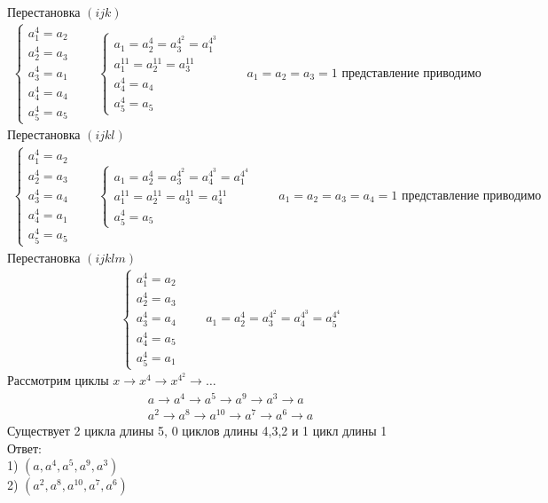 	Перестановка $(ijk)$
	\begin{gather*}
		\begin{cases}
			a_1^4 = a_2\\
			a_2^4 = a_3\\
			a_3^4 = a_1\\
			a_4^4 = a_4\\
			a_5^4 = a_5
		\end{cases}\qquad
		\begin{cases}
			a_1 = a_2^4 = a_3^{4^2} = a_1^{4^3}\\
			a_1^{11} = a_2^{11} = a_3^{11}\\
			a_4^4 = a_4\\
			a_5^4 = a_5
		\end{cases}\qquad
		a_1 = a_2 = a_3 = 1
		\text{ представление приводимо}
	\end{gather*}
	Перестановка $(ijkl)$
	\begin{gather*}
		\begin{cases}
			a_1^4 = a_2\\
			a_2^4 = a_3\\
			a_3^4 = a_4\\
			a_4^4 = a_1\\
			a_5^4 = a_5
		\end{cases}\qquad
		\begin{cases}
			a_1 = a_2^4 = a_3^{4^2} = a_4^{4^3} = a_1^{4^4}\\
			a_1^{11} = a_2^{11} = a_3^{11} = a_4^{11}\\
			a_5^4 = a_5
		\end{cases}\qquad
		a_1 = a_2 = a_3 = a_4 = 1
		\text{ представление приводимо}
	\end{gather*}	
	Перестановка $(ijklm)$
	\begin{gather*}
		\begin{cases}
			a_1^4 = a_2\\
			a_2^4 = a_3\\
			a_3^4 = a_4\\
			a_4^4 = a_5\\
			a_5^4 = a_1
		\end{cases}\qquad
			a_1 = a_2^4 = a_3^{4^2} = a_4^{4^3} = a_5^{4^4}
	\end{gather*}
	Рассмотрим циклы $x \to x^4 \to x^{4^2} \to \ldots$
	\begin{gather*}
		a \to a^4 \to a^5 \to a^9 \to a^3 \to a\\
		a^2 \to a^8 \to a^{10} \to a^7 \to a^6 \to a
	\end{gather*}
	Существует 2 цикла длины 5, 0 циклов длины 4,3,2 и 1 цикл длины 1\\
	Ответ:\\
	1) $(a, a^4, a^5, a^9, a^3)$\\
	2) $(a^2, a^8, a^{10}, a^7, a^6)$